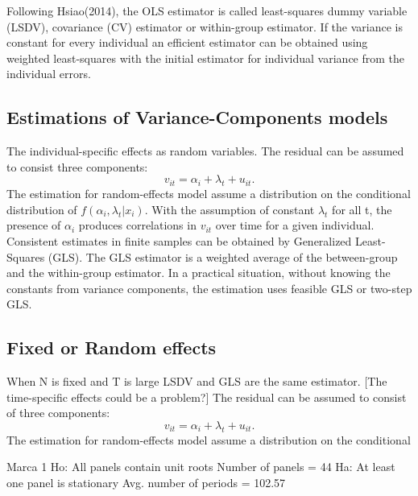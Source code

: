 \documentclass[]{article}
\begin{document}
Following Hsiao(2014), the OLS estimator is called least-squares dummy variable (LSDV), covariance (CV) estimator or within-group estimator.
If the variance is constant for every individual an efficient estimator can be obtained using weighted least-squares with the initial estimator for individual variance from the individual errors. 
 
\subsection{Estimations of Variance-Components models}
The individual-specific effects as random variables.
The residual can be assumed to consist three components:
\begin{equation*}
v_{it} = \alpha_{i} + \lambda_{t} + u_{it}.
\end{equation*}
The estimation for random-effects model assume a distribution on the conditional distribution of $f(\alpha_{i},\lambda_{t}|x_i)$.
With the assumption of constant $\lambda_{t}$ for all t, the presence of $\alpha_{i}$ produces correlations in $v_{it} $ over time for a given individual.
Consistent estimates in finite samples can be obtained by Generalized Least-Squares (GLS).
The GLS estimator is a weighted average of the between-group and the within-group estimator.
In a practical situation, without knowing the constants from variance components, the estimation uses feasible GLS or two-step GLS.

\subsection{Fixed or Random effects}
When N is fixed and T is large LSDV and GLS are the same estimator. 
[The time-specific effects could be a problem?]
The residual can be assumed to consist of three components:
\begin{equation*}
v_{it} = \alpha_{i} + \lambda_{t} + u_{it}.
\end{equation*}
The estimation for random-effects model assume a distribution on the conditional 

Marca 1
Ho: All panels contain unit roots           Number of panels       =     44
Ha: At least one panel is stationary        Avg. number of periods = 102.57
\end{document}
